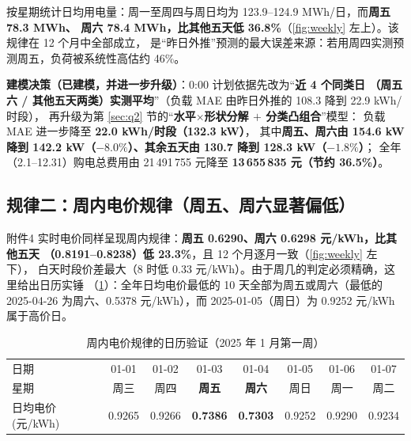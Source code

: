 按星期统计日均用电量\nobreak：周一至周四与周日均为 123.9--124.9 MWh/日\nobreak，而\textbf{周五 78.3 MWh\nobreak、
周六 78.4 MWh\nobreak，比其他五天低 36.8\%}（\cref{fig:weekly} 左上\nobreak）\nobreak。该规律在 12 个月中全部成立\nobreak，
是“昨日外推\nobreak”预测的最大误差来源\nobreak：若用周四实测预测周五\nobreak，负荷被系统性高估约 46\%\nobreak。

\textbf{建模决策（已建模\nobreak，并进一步升级\nobreak）}\nobreak：0:00 计划依据先改为“\textbf{近 4 个同类日
（周五六 / 其他五天两类\nobreak）实测平均}\nobreak”（负载 MAE 由昨日外推的 108.3 降到 22.9 kWh/时段\nobreak）\nobreak，
再升级为第 \ref{sec:q2} 节的“\textbf{水平$\times$形状分解 $+$ 分类凸组合}\nobreak”模型\nobreak：
负载 MAE 进一步降至 \textbf{22.0 kWh/时段（132.3 kW\nobreak）}\nobreak，
其中\textbf{周五\nobreak、周六由 154.6 kW 降到 142.2 kW（$-8.0\%$\nobreak）\nobreak、其余五天由 130.7 降到 128.3 kW（$-1.8\%$\nobreak）}\nobreak；
全年（2.1--12.31\nobreak）购电总费用由 21\,491\,755 元降至 \textbf{13\,655\,835 元（节约 36.5\%\nobreak）}\nobreak。

\subsection{规律二\nobreak：周内电价规律（周五\nobreak、周六显著偏低\nobreak）}

附件4 实时电价同样呈现周内规律\nobreak：\textbf{周五 0.6290\nobreak、周六 0.6298 元/kWh\nobreak，比其他五天
（0.8191--0.8238\nobreak）低 23.3\%}\nobreak，且 12 个月逐月一致（\cref{fig:weekly} 左下\nobreak）\nobreak，
白天时段价差最大（8 时低 0.33 元/kWh\nobreak）\nobreak。由于周几的判定必须精确\nobreak，这里给出日历实锤
（\cref{tab:calendar}\nobreak）\nobreak：全年日均电价最低的 10 天全部为周五或周六（最低的
2025-04-26 为周六\nobreak、0.5378 元/kWh\nobreak）\nobreak，而 2025-01-05（周日\nobreak）为 0.9252 元/kWh 属于高价日\nobreak。

\begin{table}[htbp]
\centering
\caption{周内电价规律的日历验证（2025 年 1 月第一周\nobreak）}
\label{tab:calendar}
\begin{tabular}{@{}lccccccc@{}}
\toprule
日期 & 01-01 & 01-02 & 01-03 & 01-04 & 01-05 & 01-06 & 01-07 \\
星期 & 周三 & 周四 & \textbf{周五} & \textbf{周六} & 周日 & 周一 & 周二 \\
日均电价(元/kWh) & 0.9265 & 0.9266 & \textbf{0.7386} & \textbf{0.7303} & 0.9252 & 0.9290 & 0.9234 \\
\bottomrule
\end{tabular}
\end{table}

